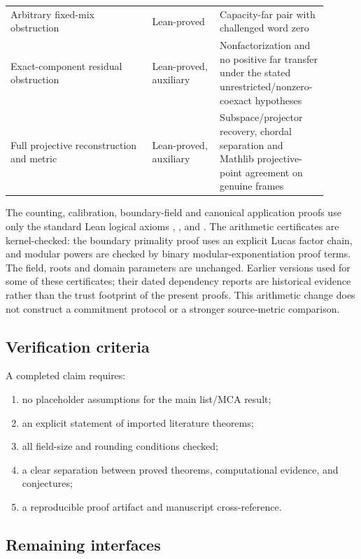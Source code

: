 \begin{longtable}{@{}>{\raggedright\arraybackslash}p{0.42\linewidth}
  >{\raggedright\arraybackslash}p{0.20\linewidth}
  >{\raggedright\arraybackslash}p{0.28\linewidth}@{}}
Arbitrary fixed-mix obstruction & Lean-proved &
  Capacity-far pair with challenged word zero\\
Exact-component residual obstruction & Lean-proved, auxiliary &
  Nonfactorization and no positive far transfer under the stated
  unrestricted/nonzero-coexact hypotheses\\
Full projective reconstruction and metric & Lean-proved, auxiliary &
  Subspace/projector recovery, chordal separation and Mathlib projective-point
  agreement on genuine frames\\
\bottomrule
\end{longtable}
\endgroup

The counting, calibration, boundary-field and canonical application proofs
use only the standard Lean logical axioms
, , and .
The arithmetic certificates are kernel-checked: the boundary primality proof
uses an explicit Lucas factor chain, and modular powers are checked by binary
modular-exponentiation proof terms. The field, roots and domain parameters
are unchanged. Earlier versions used  for some of these
certificates; their dated dependency reports are historical evidence rather
than the trust footprint of the present proofs. This arithmetic change does
not construct a commitment protocol or a stronger source-metric comparison.

\subsection{Verification criteria}

A completed claim requires:
\begin{enumerate}[label=(\roman*)]
  \item no placeholder assumptions for the main list/MCA result;
  \item an explicit statement of imported literature theorems;
  \item all field-size and rounding conditions checked;
  \item a clear separation between proved theorems, computational evidence, and
    conjectures;
  \item a reproducible proof artifact and manuscript cross-reference.
\end{enumerate}

\subsection{Remaining interfaces}

